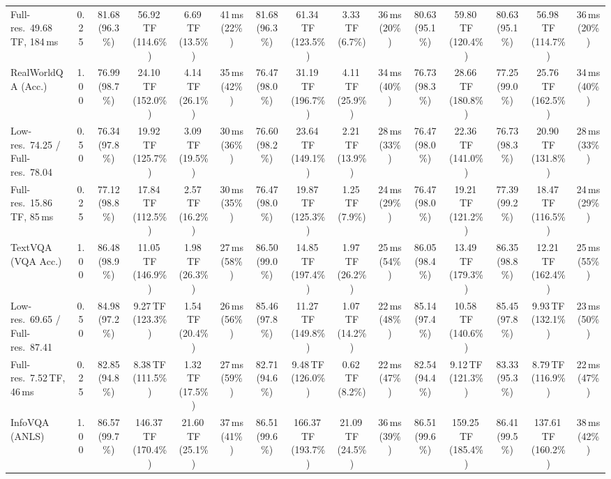 \begin{table}[t]
{\begin{tabular}{l c | c c c c | c c c c | c c | c c c}
{\footnotesize Full-res.\ 49.68\,TF, 184\,ms} & 0.25 & 81.68 (96.3\%) & 56.92\,TF (114.6\%) & 6.69\,TF (13.5\%) & 41\,ms (22\%) & 81.68 (96.3\%) & 61.34\,TF (123.5\%) & 3.33\,TF (6.7\%) & 36\,ms (20\%) & 80.63 (95.1\%) & 59.80\,TF (120.4\%) & 80.63 (95.1\%) & 56.98\,TF (114.7\%) & 36\,ms (20\%) \\
\cmidrule(lr){1-15}
RealWorldQA (Acc.) & 1.00 & \cellcolor{gray!15}76.99 (98.7\%) & 24.10\,TF (152.0\%) & 4.14\,TF (26.1\%) & 35\,ms (42\%) & 76.47 (98.0\%) & 31.19\,TF (196.7\%) & 4.11\,TF (25.9\%) & 34\,ms (40\%) & \cellcolor{gray!15}76.73 (98.3\%) & 28.66\,TF (180.8\%) & \cellcolor{gray!15}77.25 (99.0\%) & 25.76\,TF (162.5\%) & 34\,ms (40\%) \\
{\footnotesize Low-res.\ 74.25 / Full-res.\ 78.04} & 0.50 & 76.34 (97.8\%) & 19.92\,TF (125.7\%) & 3.09\,TF (19.5\%) & 30\,ms (36\%) & \cellcolor{gray!15}76.60 (98.2\%) & 23.64\,TF (149.1\%) & 2.21\,TF (13.9\%) & 28\,ms (33\%) & 76.47 (98.0\%) & 22.36\,TF (141.0\%) & \cellcolor{gray!15}76.73 (98.3\%) & 20.90\,TF (131.8\%) & 28\,ms (33\%) \\
{\footnotesize Full-res.\ 15.86\,TF, 85\,ms} & 0.25 & \cellcolor{gray!15}77.12 (98.8\%) & 17.84\,TF (112.5\%) & 2.57\,TF (16.2\%) & 30\,ms (35\%) & 76.47 (98.0\%) & 19.87\,TF (125.3\%) & 1.25\,TF (7.9\%) & 24\,ms (29\%) & 76.47 (98.0\%) & 19.21\,TF (121.2\%) & \cellcolor{gray!15}77.39 (99.2\%) & 18.47\,TF (116.5\%) & 24\,ms (29\%) \\
\cmidrule(lr){1-15}
TextVQA (VQA Acc.) & 1.00 & \cellcolor{gray!15}86.48 (98.9\%) & 11.05\,TF (146.9\%) & 1.98\,TF (26.3\%) & 27\,ms (58\%) & \cellcolor{gray!15}86.50 (99.0\%) & 14.85\,TF (197.4\%) & 1.97\,TF (26.2\%) & 25\,ms (54\%) & \cellcolor{gray!15}86.05 (98.4\%) & 13.49\,TF (179.3\%) & \cellcolor{gray!15}86.35 (98.8\%) & 12.21\,TF (162.4\%) & 25\,ms (55\%) \\
{\footnotesize Low-res.\ 69.65 / Full-res.\ 87.41} & 0.50 & 84.98 (97.2\%) & 9.27\,TF (123.3\%) & 1.54\,TF (20.4\%) & 26\,ms (56\%) & 85.46 (97.8\%) & 11.27\,TF (149.8\%) & 1.07\,TF (14.2\%) & 22\,ms (48\%) & 85.14 (97.4\%) & 10.58\,TF (140.6\%) & 85.45 (97.8\%) & 9.93\,TF (132.1\%) & 23\,ms (50\%) \\
{\footnotesize Full-res.\ 7.52\,TF, 46\,ms} & 0.25 & 82.85 (94.8\%) & 8.38\,TF (111.5\%) & 1.32\,TF (17.5\%) & 27\,ms (59\%) & 82.71 (94.6\%) & 9.48\,TF (126.0\%) & 0.62\,TF (8.2\%) & 22\,ms (47\%) & 82.54 (94.4\%) & 9.12\,TF (121.3\%) & 83.33 (95.3\%) & 8.79\,TF (116.9\%) & 22\,ms (47\%) \\
\cmidrule(lr){1-15}
InfoVQA (ANLS) & 1.00 & \cellcolor{gray!15}86.57 (99.7\%) & 146.37\,TF (170.4\%) & 21.60\,TF (25.1\%) & 37\,ms (41\%) & \cellcolor{gray!15}86.51 (99.6\%) & 166.37\,TF (193.7\%) & 21.09\,TF (24.5\%) & 36\,ms (39\%) & \cellcolor{gray!15}86.51 (99.6\%) & 159.25\,TF (185.4\%) & \cellcolor{gray!15}86.41 (99.5\%) & 137.61\,TF (160.2\%) & 38\,ms (42\%) \\

\end{tabular}}
\end{table}
